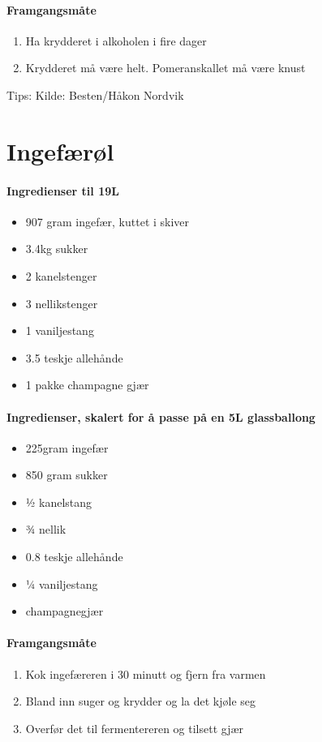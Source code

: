\documentclass[12pt,a4paper]{book}
\begin{document}
{\paragraph{Framgangsmåte}
\begin{enumerate}[noitemsep]
	\item Ha krydderet i alkoholen i fire dager
	\item Krydderet må være helt. Pomeranskallet må være knust
\end{enumerate}

Tips:
Kilde: Besten/Håkon Nordvik
\clearpage{}
\clearpage{}\section{﻿Ingefærøl}


\paragraph{Ingredienser til 19L}
\begin{itemize}[noitemsep]
	\item 907 gram ingefær, kuttet i skiver
	\item 3.4kg sukker
	\item 2 kanelstenger
	\item 3 nellikstenger
	\item 1 vaniljestang
	\item 3.5 teskje allehånde
	\item 1 pakke champagne gjær
\end{itemize}

\paragraph{Ingredienser, skalert for å passe på en 5L glassballong}
\begin{itemize}[noitemsep]
	\item 225gram ingefær
	\item 850 gram sukker
	\item ½ kanelstang
	\item ¾ nellik
	\item 0.8 teskje allehånde
	\item ¼ vaniljestang
	\item champagnegjær
\end{itemize}

\paragraph{Framgangsmåte}
\begin{enumerate}[noitemsep]
	\item Kok ingefæreren i 30 minutt og fjern fra varmen
	\item Bland inn suger og krydder og la det kjøle seg
	\item Overfør det til fermentereren og tilsett gjær


\end{enumerate}}
\end{document}
